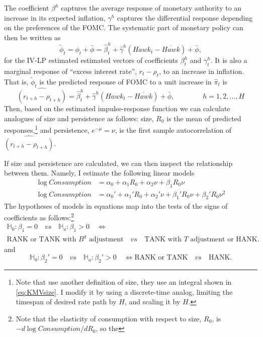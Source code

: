 \documentclass[12pt]{article}
\numberwithin{equation}{section}
\begin{document}
The coefficient $\beta^h$ captures the average response of monetary authority to an increase in its expected inflation, $\gamma^h$ captures the differential response depending on the preferences of the FOMC. The systematic part of monetary policy can then be written as 
\[\tilde \phi_t=\phi_t+\bar\phi=\hat \beta_t^h+\hat\gamma^h \left(\mathit{Hawk}_{t}-\overline{\mathit{Hawk}}\right)+\bar\phi,\]
for the IV-LP estimated estimated vectors of coefficients $\beta_t^h$ and $\gamma_t^h$. It is also a marginal response of ``excess interest rate'', $r_t-\rho_t$, to an increase in inflation. 
That is, $\tilde \phi_t$ is the predicted response of FOMC to a unit increase in $\hat\pi_t$ is 
\begin{equation}
   \widehat{\left(r_{t+h}-\rho_{t+h}\right)}=\hat \beta_t^h+\hat\gamma^h \left(\mathit{Hawk}_{t}-\overline{\mathit{Hawk}}\right)+\bar\phi,\qquad\qquad h=1,2,\dots, H
\end{equation}
Then, based on the estimated impulse-response function we can calculate analogues of size and persistence as follows: size, $R_0$ is the mean of predicted responses,\footnote{Note that \cite{KMV2018} use another definition of size, they use an integral shown in \vref{eq:KMVsize}. I modify it by using a discrete-time analog, limiting the timespan of desired rate path by $H$, and scaling it by $H$.} and persistence, $e^{-\mu}=\nu$, is the first sample autocorrelation of $\widehat{\left(r_{t+h}-\rho_{t+h}\right)}$.

If size and persistence are calculated, we can then inspect the relationship between them. Namely, I estimate the following linear models 
\begin{align}
    \log \mathit{Consumption}&=\alpha_0+\alpha_1 R_0+\alpha_2\nu+\beta_1 R_0\nu \label{eq:linear}\\
    \log \mathit{Consumption}&=\alpha_0'+\alpha_1' R_0+\alpha_2'\nu+\beta_1' R_0\nu + \beta_2' R_0\nu^2\label{eq:quadratic}
\end{align} 
The hypotheses of models in equations  map into the tests of the signs of coefficients as follows:\footnote{Note that the elasticity of consumption with respect to size, $R_0$, is $-d\log \mathit{Consumption}/d R_0$, so the } 
\begin{multline*}\mathbb{H}_0:\beta_1=0\quad\mathit{vs}\quad \mathbb{H}_a:\beta_1>0\quad\iff\\  \text{RANK or TANK with $B^g$ adjustment}\quad\mathit{vs}\quad \text{TANK with $T$ adjustment or HANK}.\end{multline*}
and
\[\mathbb{H}_0:\beta_2'=0\quad\mathit{vs}\quad \mathbb{H}_a:\beta_2'>0\quad\iff \text{RANK or TANK}\quad\mathit{vs}\quad \text{HANK}.\]
\end{document}
